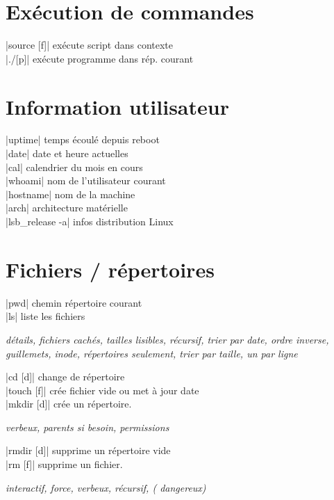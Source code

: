 \documentclass[9pt]{extarticle}
\newenvironment{cmdblock}{%
  \par\setlength{\parindent}{0pt}\setlength{\parskip}{0pt}%
  \RaggedRight%
}{\par}
\newlength{\cmdoptindent}
\newcommand{\cmdopt}[1]{%
  \hspace*{\cmdoptindent}%
  \begin{minipage}[t]{\dimexpr\linewidth-\cmdoptindent\relax}
    \RaggedRight \itshape #1%
  \end{minipage}\par
}
\begin{document}
\begin{multicols}{4}
    \section*{Exécution de commandes}
    \begin{cmdblock}
        \code|source [f]| \quad exécute script dans contexte \\
        \code|./[p]| \quad exécute programme dans rép. courant \\
    \end{cmdblock}

    \section*{Information utilisateur}
    \begin{cmdblock}
        \code|uptime| \quad temps écoulé depuis reboot \\
        \code|date| \quad date et heure actuelles \\
        \code|cal| \quad calendrier du mois en cours \\
        \code|whoami| \quad nom de l'utilisateur courant \\
        \code|hostname| \quad nom de la machine \\
        \code|arch| \quad architecture matérielle \\
        \code|lsb_release -a| \quad infos distribution Linux \\
    \end{cmdblock}

    \section*{Fichiers / répertoires}

    \begin{cmdblock}
        \code|pwd| \quad chemin répertoire courant \\
        \code|ls| \quad liste les fichiers \\
        \cmdopt{ détails,  fichiers cachés,
            \codx{-h} tailles lisibles, \codx{-R} récursif,
            \codx{-t} trier par date, \codx{-r} ordre inverse,
            \codx{-Q} guillemets, \codx{-i} inode,
            \codx{-d} répertoires seulement, \codx{-S} trier par taille,
            \codx{-1} un par ligne}
        \code|cd [d]| \quad change de répertoire \\
        \code|touch [f]| \quad crée fichier vide ou met à jour date \\
        \code|mkdir [d]| \quad crée un répertoire. \\
        \cmdopt{ verbeux,
         parents si besoin,
        \codx{-m [perms]} permissions}
        \code|rmdir [d]| \quad supprime un répertoire vide \\
        \code|rm [f]| \quad supprime un fichier. \\
        \cmdopt{ interactif,
             force,
            \codx{-v} verbeux,
            \codx{-r} récursif, (\codx{rm -rf} dangereux)}


\end{cmdblock}
\end{multicols}
\end{document}
